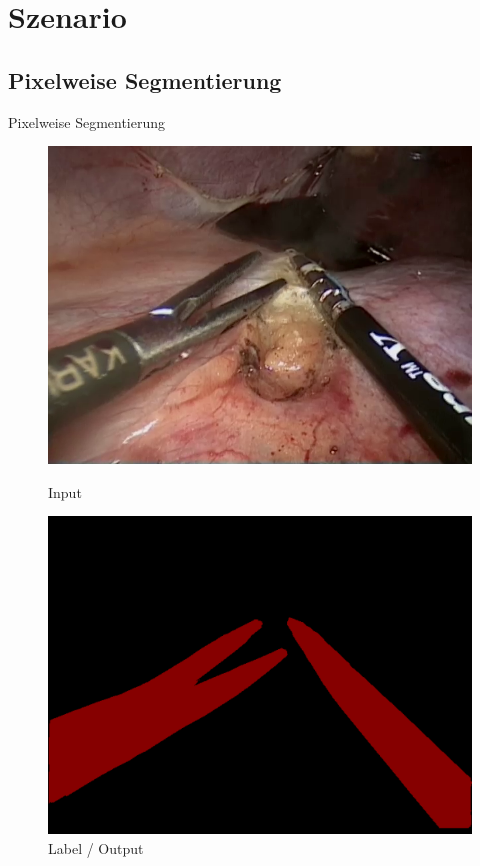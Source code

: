 
\section{Szenario}
\subsection{Pixelweise Segmentierung}
\begin{frame}{Pixelweise Segmentierung}
    \begin{figure}[ht]
        \begin{minipage}[b]{0.45\linewidth}
            \centering
            \includegraphics[width=\textwidth]{../images/img_35_raw.png}
            \caption{Input}
            \label{fig:input}
        \end{minipage}
        \hspace{0.5cm}
        \begin{minipage}[b]{0.45\linewidth}
            \centering
            \includegraphics[width=\textwidth]{../images/img_35_label.png}
            \caption{Label / Output}
            \label{fig:label}
        \end{minipage}
    \end{figure}
\end{frame}

